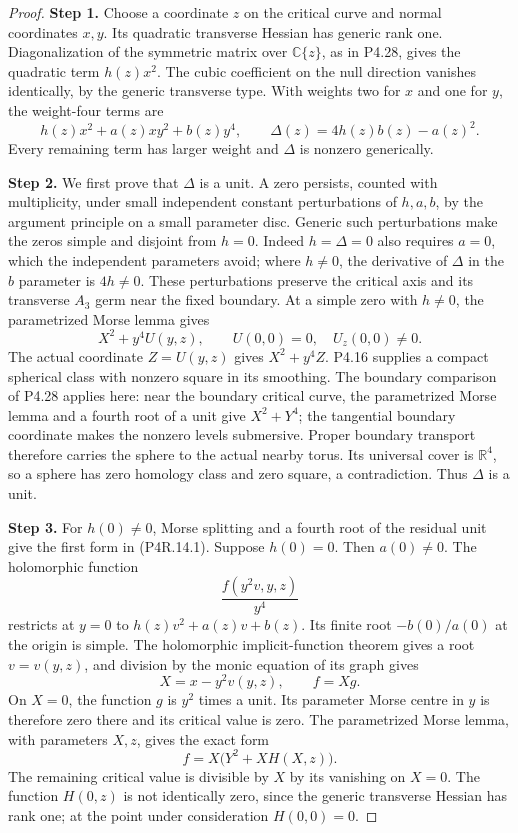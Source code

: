 \begin{proof}
\noindent\textbf{Step 1.} Choose a coordinate $z$ on the critical curve and normal
coordinates $x,y$. Its quadratic transverse Hessian has generic
rank one. Diagonalization of the symmetric matrix over
$\mathbb C\{z\}$, as in P4.28, gives the quadratic term
$h(z)x^2$. The cubic coefficient on the null direction
vanishes identically, by the generic transverse type. With
weights two for $x$ and one for $y$, the weight-four terms are
\[
 h(z)x^2+a(z)xy^2+b(z)y^4,\qquad
 \Delta(z)=4h(z)b(z)-a(z)^2.                             \tag{P4R.14.2}
\]
Every remaining term has larger weight and $\Delta$ is
nonzero generically.

\noindent\textbf{Step 2.} We first prove that $\Delta$ is a unit. A zero persists,
counted with multiplicity, under small independent constant
perturbations of $h,a,b$, by the argument principle on a
small parameter disc. Generic such perturbations make the
zeros simple and disjoint from $h=0$. Indeed $h=\Delta=0$
also requires $a=0$, which the independent parameters avoid;
where $h\ne0$, the derivative of $\Delta$ in the $b$
parameter is $4h\ne0$. These perturbations preserve the
critical axis and its transverse $A_3$ germ near the fixed
boundary. At a simple zero with $h\ne0$, the parametrized
Morse lemma gives
\[
 X^2+y^4U(y,z),\qquad U(0,0)=0,\quad U_z(0,0)\ne0.
\]
The actual coordinate $Z=U(y,z)$ gives $X^2+y^4Z$.
P4.16 supplies a compact spherical class with nonzero square
in its smoothing. The boundary comparison of P4.28 applies
here: near the boundary critical curve, the parametrized
Morse lemma and a fourth root of a unit give $X^2+Y^4$;
the tangential boundary coordinate makes the nonzero levels
submersive. Proper boundary transport therefore carries the
sphere to the actual nearby torus. Its universal cover is
$\mathbb R^4$, so a sphere has zero homology class and zero
square, a contradiction. Thus $\Delta$ is a unit.

\noindent\textbf{Step 3.} For $h(0)\ne0$, Morse splitting and a fourth root of the
residual unit give the first form in (P4R.14.1). Suppose
$h(0)=0$. Then $a(0)\ne0$. The holomorphic function
\[
 \frac{f(y^2v,y,z)}{y^4}
\]
restricts at $y=0$ to $h(z)v^2+a(z)v+b(z)$. Its finite
root $-b(0)/a(0)$ at the origin is simple. The holomorphic
implicit-function theorem gives a root $v=v(y,z)$, and
division by the monic equation of its graph gives
\[
 X=x-y^2v(y,z),\qquad f=Xg.
\]
On $X=0$, the function $g$ is $y^2$ times a unit. Its
parameter Morse centre in $y$ is therefore zero there and
its critical value is zero. The parametrized Morse lemma,
with parameters $X,z$, gives the exact form
\[
 f=X\bigl(Y^2+XH(X,z)\bigr).                            \tag{P4R.14.3}
\]
The remaining critical value is divisible by $X$ by its
vanishing on $X=0$. The function $H(0,z)$ is not identically
zero, since the generic transverse Hessian has rank one;
at the point under consideration $H(0,0)=0$.


\end{proof}
